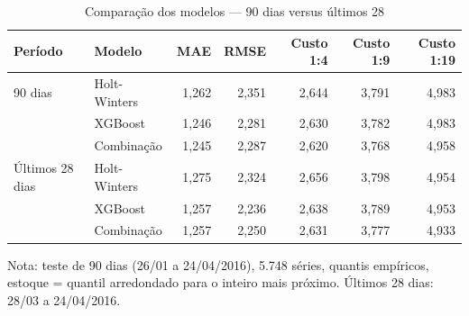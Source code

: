 \begin{table}[htbp]
\centering
\small
\caption{Comparação dos modelos — 90 dias versus últimos 28}
\label{tab:comp_verificacao_28d}
\begin{tabular}{llrrrrr}
\toprule
Período & Modelo & MAE & RMSE & Custo 1:4 & Custo 1:9 & Custo 1:19 \\
\midrule
90 dias & Holt-Winters & 1,262 & 2,351 & 2,644 & 3,791 & 4,983 \\
 & XGBoost & 1,246 & 2,281 & 2,630 & 3,782 & 4,983 \\
 & Combinação & 1,245 & 2,287 & 2,620 & 3,768 & 4,958 \\
\addlinespace
Últimos 28 dias & Holt-Winters & 1,275 & 2,324 & 2,656 & 3,798 & 4,954 \\
 & XGBoost & 1,257 & 2,236 & 2,638 & 3,789 & 4,953 \\
 & Combinação & 1,257 & 2,250 & 2,631 & 3,777 & 4,933 \\
\bottomrule
\end{tabular}
\par\smallskip
{\footnotesize Nota: teste de 90 dias (26/01 a 24/04/2016), 5.748 séries, quantis empíricos, estoque = quantil arredondado para o inteiro mais próximo. Últimos 28 dias: 28/03 a 24/04/2016.}
\end{table}
